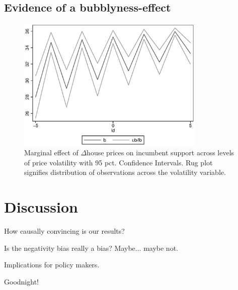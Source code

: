 \documentclass[12pt,a4paper]{article}
\begin{document}


\subsection{Evidence of a  bubblyness-effect}



\begin{figure}
	\includegraphics[width=0.8\textwidth]{../figures/volatilityinteraction.eps}
	\centering
	\caption{Marginal effect of $\Delta$house prices on incumbent support across levels of price volatility with 95 pct. Confidence Intervals. Rug plot signifies distribution of observations across the volatility variable.}
\end{figure}






\section{Discussion}

How causally convincing is our results?

Is the negativity bias really a bias? Maybe... maybe not.

Implications for policy makers.

Goodnight!








\clearpage

\singlespacing



\end{document}
